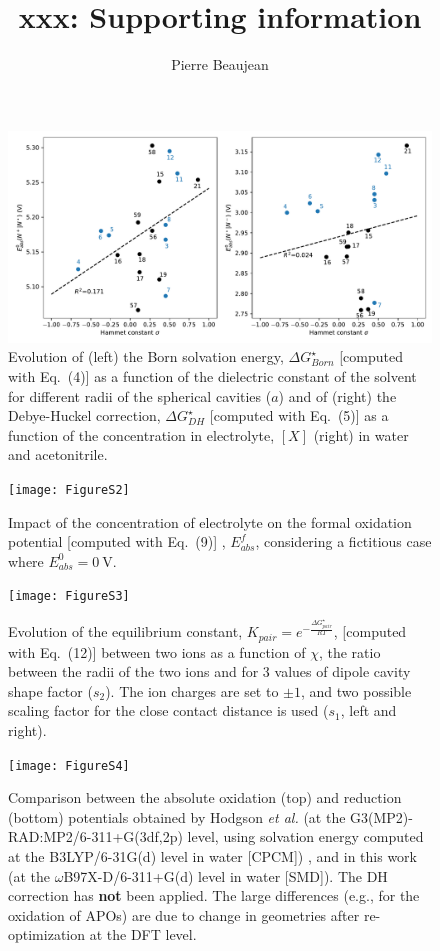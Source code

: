 \documentclass[11pt,a4paper]{article}
\title{xxx: Supporting information}
\author{Pierre Beaujean}
\begin{document}
\maketitle


\renewcommand{\thetable}{S\arabic{table}}
\renewcommand{\thefigure}{S\arabic{figure}}

\begin{figure}[!h]
	\centering
	\includegraphics [width=\linewidth]{FigureS1}
	\caption{Evolution of (left) the Born solvation energy, $\Delta G^\star_{Born}$ [computed with Eq.~(4)] as a function of the dielectric constant of the solvent for different radii of  the spherical cavities ($a$) and of (right) the Debye-Huckel correction, $\Delta G^\star_{DH}$  [computed with Eq.~(5)] as a function of the concentration in electrolyte, $[X]$ (right) in water and acetonitrile.}
\end{figure}

\begin{figure}[!h]
\centering
\texttt{[image: FigureS2]}
\caption{Impact of the concentration of electrolyte on the formal oxidation potential [computed with Eq.~(9)] , $E^f_{abs}$, considering a fictitious case where $E^0_{abs} = \SI{0}{\volt}$.}
\end{figure}

\begin{figure}[!h]
\centering
\texttt{[image: FigureS3]}
\caption{Evolution of the equilibrium constant, $K_{pair} = e^{-\frac{\Delta G^\star_{pair}}{RT}}$, [computed with Eq.~(12)] between two ions as a function of $\chi$, the ratio between the radii of the two ions and for 3 values of dipole cavity shape factor ($s_2$). The ion charges are set to $\pm 1$, and two possible scaling factor for  the close contact distance is used ($s_1$, left and right). }
\end{figure}


\begin{figure}[!h]
	\centering
	\texttt{[image: FigureS4]}
	\caption{Comparison between the absolute oxidation (top) and reduction (bottom) potentials obtained by Hodgson \emph{et al.} (at the G3(MP2)-RAD:MP2/6-311+G(3df,2p) level, using solvation energy computed at the B3LYP/6-31G(d) level in water [CPCM]) \cite{hodgsonOneElectronOxidationReduction2007}, and in this work (at the $\omega$B97X-D/6-311+G(d) level in water [SMD]). The DH correction has \textbf{not} been applied. The large differences (e.g., for the oxidation of APOs) are due to change in geometries after re-optimization at the DFT level.}
\end{figure}
\end{document}
